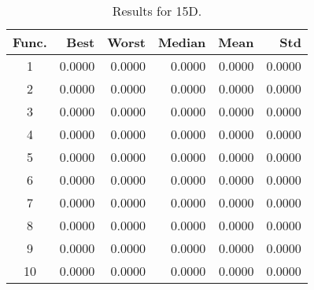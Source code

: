\begin{table}[ht]
\centering
\caption{ Results for 15D. }
\label{tab:15D}
\begin{tabular}{crrrrr}
\hline
{Func.} & Best & Worst & Median & Mean & Std \\
\hline
1 & 0.0000 & 0.0000 & 0.0000 & 0.0000 & 0.0000 \\
2 & 0.0000 & 0.0000 & 0.0000 & 0.0000 & 0.0000 \\
3 & 0.0000 & 0.0000 & 0.0000 & 0.0000 & 0.0000 \\
4 & 0.0000 & 0.0000 & 0.0000 & 0.0000 & 0.0000 \\
5 & 0.0000 & 0.0000 & 0.0000 & 0.0000 & 0.0000 \\
6 & 0.0000 & 0.0000 & 0.0000 & 0.0000 & 0.0000 \\
7 & 0.0000 & 0.0000 & 0.0000 & 0.0000 & 0.0000 \\
8 & 0.0000 & 0.0000 & 0.0000 & 0.0000 & 0.0000 \\
9 & 0.0000 & 0.0000 & 0.0000 & 0.0000 & 0.0000 \\
10 & 0.0000 & 0.0000 & 0.0000 & 0.0000 & 0.0000 \\
\hline
\end{tabular}
\end{table}

